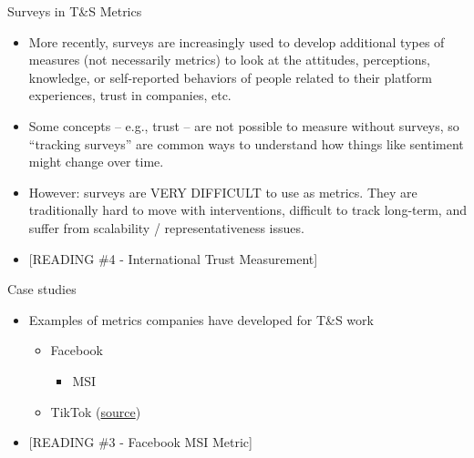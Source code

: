 \documentclass[nobackground,dvipsnames,table]{beamer}
\begin{document}
\begin{frame}{Surveys in T\&S Metrics}

\footnotesize{
\begin{itemize}
    \item More recently, surveys are increasingly used to develop additional types of measures (not necessarily metrics) to look at the attitudes, perceptions, knowledge, or self-reported behaviors of people related to their platform experiences, trust in companies, etc.
    \item Some concepts – e.g., trust – are not possible to measure without surveys, so “tracking surveys” are common ways to understand how things like sentiment might change over time.


    \item However: surveys are VERY DIFFICULT to use as metrics. They are traditionally hard to move with interventions, difficult to track long-term, and suffer from scalability / representativeness issues. 


    \item {[READING \#4 - International Trust Measurement]}
\end{itemize}
}
\end{frame}


\begin{frame}{Case studies}

\begin{itemize}
    \item Examples of metrics companies have developed for T\&S work

    \begin{itemize}
        \item Facebook
        \begin{itemize}
            \item MSI
        \end{itemize}
        \item TikTok (\href{https://www.linkedin.com/pulse/graphical-conception-keyword-based-proactivity-ka-tsai-ku/}{source})
    \end{itemize}
    \item {[READING \#3 - Facebook MSI Metric]}
\end{itemize}

\end{frame}
\end{document}
